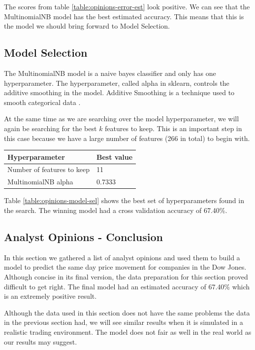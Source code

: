 \documentclass{report}
\begin{document}
The scores from table \ref{table:opinions-error-est} look positive. We can see that the MultinomialNB model has the best estimated accuracy. This means that this is the model we should bring forward to Model Selection.

\subsection{Model Selection}

The MultinomialNB model is a naive bayes classifier and only has one hyperparameter. The hyperparameter, called alpha in sklearn, controls the additive smoothing in the model. Additive Smoothing is a technique used to smooth categorical data \cite{manning2008introduction}.

At the same time as we are searching over the model hyperparameter, we will again be searching for the best $k$ features to keep. This is an important step in this case because we have a large number of features (266 in total) to begin with.

\begin{center}
  \vspace{8pt}
  \begin{tabular}{l | l}
	  \textbf{Hyperparameter} & \textbf{Best value} \\ \hline
	  Number of features to keep & 11 \\ \hline
	  MultinomialNB alpha & 0.7333
	  \label{table:opinions-model-sel}
  \end{tabular}
\end{center}

Table \ref{table:opinions-model-sel} shows the best set of hyperparameters found in the search. The winning model had a cross validation accuracy of 67.40\%.

\subsection{Analyst Opinions - Conclusion}

In this section we gathered a list of analyst opinions and used them to build a model to predict the same day price movement for companies in the Dow Jones. Although concise in its final version, the data preparation for this section proved difficult to get right. The final model had an estimated accuracy of 67.40\% which is an extremely positive result. 

Although the data used in this section does not have the same problems the data in the previous section had, we will see similar results when it is simulated in a realistic trading environment. The model does not fair as well in the real world as our results may suggest.
\end{document}
